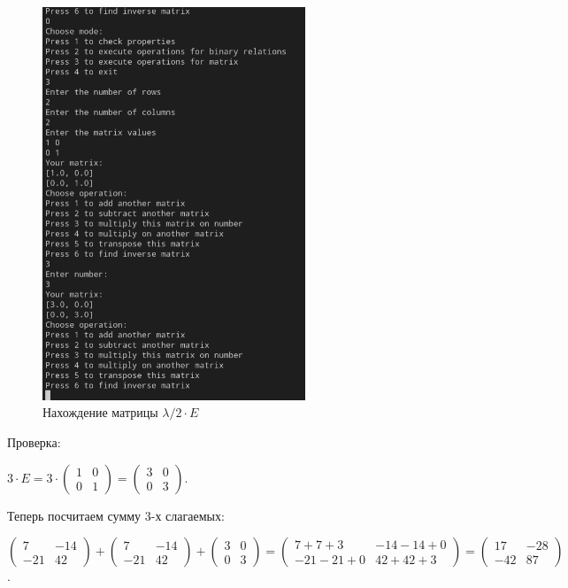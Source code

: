 \documentclass[bachelor, och, labwork]{shiza}
\begin{document}
        \begin{figure}[H]
            \centering
            \includegraphics[width=0.7\textwidth]{photo/4.png}
            \caption{Нахождение матрицы $\lambda / 2\cdot E$}
        \end{figure} 

        Проверка:
        
        $3 \cdot E = 3 \cdot
        \begin{pmatrix}
            1 & 0 \\
            0 & 1
        \end{pmatrix} =
        \begin{pmatrix}
            3 & 0 \\
            0 & 3
        \end{pmatrix}$.

        Теперь посчитаем сумму 3-х слагаемых:

        $\begin{pmatrix}
            7 & -14 \\
            -21 & 42
        \end{pmatrix} +
        \begin{pmatrix}
            7 & -14 \\
            -21 & 42
        \end{pmatrix} +
        \begin{pmatrix}
            3 & 0 \\
            0 & 3
        \end{pmatrix} =
        \begin{pmatrix}
            7 + 7 + 3 & -14  -14 + 0 \\
            -21 -21 + 0 & 42 + 42 + 3
        \end{pmatrix} =
        \begin{pmatrix}
            17 & -28 \\
            -42 & 87
        \end{pmatrix}$.
\end{document}
